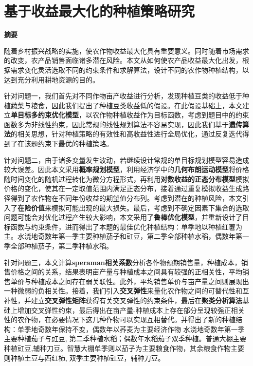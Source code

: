 \documentclass[12pt]{ctexart}
\begin{document}
  
	
	\section*{基于收益最大化的种植策略研究} 
	\begin{center}  
		\Large\textbf{摘要}  
	\end{center}  
	
	\noindent   
	
	
	随着乡村振兴战略的实施，使农作物收益最大化具有重要意义。同时随着市场需求的改变，农产品销售面临诸多潜在风险。本文从如何使农产品收益最大化出发，根据需求变化灵活选取不同的约束条件和求解算法，设计不同的农作物种植结构，以达到充分利用耕地资源的目的。
	
	
	针对问题一，我们首先对不同作物亩产收益进行分析，发现种植豆类的收益低于种植蔬菜与粮食，因此我们提出了种植豆类收益低的假设。在此假设基础上，本文建立\textbf{单目标多约束优化模型}，以农作物种植收益作为目标函数，考虑到题目中的约束函数多为非线性约束，因此常规的线性规划算法不容易实现，因此我们基于\textbf{遗传算法}的相关思想，针对种植策略的有效性和高收益性进行全局优化，通过反复迭代得到了在该题约束下最优的种植策略。
	
	
	针对问题二，由于诸多变量发生波动，若继续设计常规的单目标规划模型容易造成较大误差。因此本文采用\textbf{概率规划模型}，利用经济学中的\textbf{几何布朗运动模型}将价格随时间变化的随机过程转化为微分方程形式，再利用\textbf{对数收益的正态分布模型}模拟价格的变化，使其在一定取值范围内满足正态分布，接着通过重复模拟收益生成路径得到了农作物在不同年份收益的期望值分布列。考虑到潜在的种植风险，本文引入了\textbf{在险价值}来模拟可能出现的最大损失。最后，考虑到不确定因素下集合的选取问题可能会对优化过程产生较大影响，本文采用了\textbf{鲁棒优化模型}，并重新设计了目标函数与约束条件，进而得出了本题的最佳优化种植结构：单季地以种植红薯为主。水浇地奇数年第一季主要种植茄子和豇豆，第二季全部种植水稻，偶数年第一季全部种植茄子，第二季种植水稻。
	
	
	针对问题三，本文计算\textbf{speraman相关系数}分析各作物预期销售量，种植成本，销售价格之间的关系，结果表明亩产量与种植成本之间具有较强的正相关性，平均销售单价与种植成本之间存在弱关联性。此外，平均销售单价与亩产量之间则展现出一种微弱的负相关性。接着，我们引入\textbf{交叉弹性}来量化农作物之间的可替代性和互补性，并建立\textbf{交叉弹性矩阵}获得有关交叉弹性的约束条件，最后在\textbf{聚类分析算法}基础上增加交叉弹性约束，最后得出在亩产量-种植成本上存在部分呈现较强正相关性的农作物，在必要情况下这几种作物可以实现互相替代。并得出了新的种植结构：单季地奇数年保持不变，偶数年以荞麦为主要经济作物
	水浇地奇数年第一季主要种植茄子与豇豆, 第二季种植水稻；偶数年水稻茄子双季种植。普通大棚主要种植豇豆,辅种刀豆。智慧大棚单季则以茄子为主要粮食作物，其余粮食作物主要则种植土豆与西红柿, 双季主要种植豇豆，辅种刀豆。 
	
\end{document}

